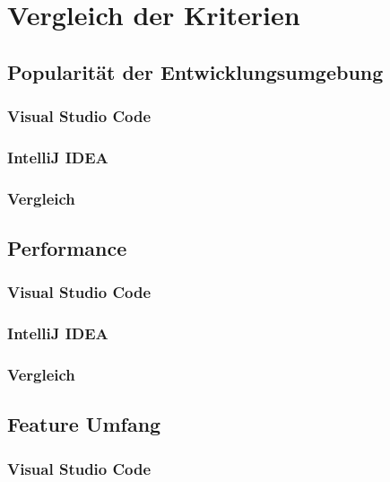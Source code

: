 \chapter{Vergleich der Kriterien}
\label{cha:Vergleich}

\section{Popularität der Entwicklungsumgebung}
\label{sec:Vergleich_Popularität}

\subsection{Visual Studio Code}

\subsection{IntelliJ IDEA}

\subsection{Vergleich}


\section{Performance}
\label{sec:Vergleich_Performance}

\subsection{Visual Studio Code}

\subsection{IntelliJ IDEA}

\subsection{Vergleich}


\section{Feature Umfang}
\label{sec:Vergleich_FeatureUmfang}

\subsection{Visual Studio Code}

